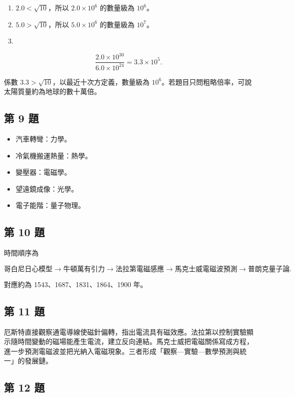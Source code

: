 \documentclass[11pt,a4paper]{article}
\providecommand{\tightlist}{%
  \setlength{\itemsep}{0pt}\setlength{\parskip}{0pt}}
\begin{document}
\begin{enumerate}
\def\labelenumi{(\arabic{enumi})}
\item
  \(2.0<\sqrt{10}\)，所以 \(2.0\times10^6\) 的數量級為 \(10^6\)。
\item
  \(5.0>\sqrt{10}\)，所以 \(5.0\times10^6\) 的數量級為 \(10^7\)。
\item
\end{enumerate}

\[
\frac{2.0\times10^{30}}{6.0\times10^{24}}
=3.3\times10^5.
\]

係數 \(3.3>\sqrt{10}\)，以最近十次方定義，數量級為 \(10^6\)。若題目只問粗略倍率，可說太陽質量約為地球的數十萬倍。

\subsection{第 9 題}\label{ux7b2c-9-ux984c}

\begin{itemize}
\tightlist
\item
  汽車轉彎：力學。
\item
  冷氣機搬運熱量：熱學。
\item
  變壓器：電磁學。
\item
  望遠鏡成像：光學。
\item
  電子能階：量子物理。
\end{itemize}

\subsection{第 10 題}\label{ux7b2c-10-ux984c}

時間順序為

\[
\text{哥白尼日心模型}
\rightarrow
\text{牛頓萬有引力}
\rightarrow
\text{法拉第電磁感應}
\rightarrow
\text{馬克士威電磁波預測}
\rightarrow
\text{普朗克量子論}.
\]

對應約為 1543、1687、1831、1864、1900 年。

\subsection{第 11 題}\label{ux7b2c-11-ux984c}

厄斯特直接觀察通電導線使磁針偏轉，指出電流具有磁效應。法拉第以控制實驗顯示隨時間變動的磁場能產生電流，建立反向連結。馬克士威把電磁關係寫成方程，進一步預測電磁波並把光納入電磁現象。三者形成「觀察---實驗---數學預測與統一」的發展鏈。

\subsection{第 12 題}\label{ux7b2c-12-ux984c}
\end{document}

